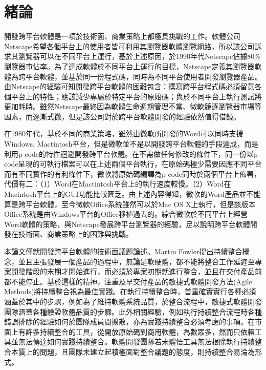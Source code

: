 \chapter{緒論}

開發跨平台軟體是一項於技術面、商業策略上都極具挑戰的工作。軟體公司Netscape希望各個平台上的使用者皆可利用其瀏覽器軟體瀏覽網路，所以該公司訴求其瀏覽器可以在不同平台上運行，基於上述原因，於1990年代Netscape佔據80\%瀏覽器市佔率\cite{netscape1990marketshare}。為了達成軟體於不同平台上運行的目標，Netscape定義其瀏覽器軟體為跨平台軟體，並基於同一份程式碼，同時為不同平台使用者開發瀏覽器產品。由Netscape的經驗可知開發跨平台軟體的困難包含：撰寫跨平台程式碼必須留意各個平台上的特性；應該減少專屬於特定平台的原始碼；與於不同平台上執行測試將更加耗時\cite{netscapecrossplatform}。雖然Netscape最終因為軟體生命週期管理不當、微軟競逐瀏覽器市場等因素，而逐漸式微，但是該公司對於跨平台軟體開發的經驗依然值得借鏡。

在1980年代，基於不同的商業策略，雖然由微軟所開發的Word可以同時支援Windows, Mactintosh平台，但是微軟並不是以開發跨平台軟體的手段達成，而是利用p-code\cite{microsoftpcode}的特性迴避開發跨平台軟體\cite{netscapecrossplatform}。在不需做任何修改的條件下，同一份以p-code呈現的可執行檔案可以在上述兩個平台執行，在原始碼極少需要因應不同平台而有不同實作的有利條件下，微軟將原始碼編譯為p-code同時於兩個平台上佈署，代價有二：（1）Word在Mactintosh平台上的執行速度較慢。（2）Word在Macintosh平台上的GUI功能比較匱乏。由上述內容得知，微軟的Word產品並不能算是跨平台軟體，至今微軟Office系統雖然可以於Mac OS X上執行，但是該版本Office系統是由Windows平台的Office移植過去的。綜合微軟於不同平台上經營Word軟體的策略，與Netscape發展跨平台瀏覽器的經驗，足以說明跨平台軟體開發在技術面、商業策略上的困難與挑戰。

本論文僅就開發跨平台軟體的技術面議題論述。Martin Fowler提出持續整合概念，並且主張發展一個產品的過程中，無論是軟硬體，都不能將整合工作延遲至專案開發階段的末期才開始進行，而必須於專案初期就進行整合，並且在交付產品前都不能停止\cite{martinfowlerci}。基於這樣的精神，注重及早交付產品的敏捷式軟體開發方法(Agile Methods)將持續整合視為最佳實踐\cite{xpagilemethods}。在執行持續整合時，首重確實實行各種必須涵蓋於其中的步驟，例如為了維持軟體系統品質，於整合流程中，敏捷式軟體開發團隊涵蓋各種驗證軟體品質的步驟。此外相關經驗，例如執行持續整合流程時各種錯誤排除的經驗如何於團隊成員間擴散，亦為實踐持續整合必須考慮的事項。在市面上有許多持續整合的工具，從開放原始碼到商用軟體，為數眾多，然而只依賴工具並無法傳達如何實踐持續整合。軟體開發團隊若未體悟工具無法根除執行持續整合本質上的問題，且團隊未建立起積極面對整合議題的態度，則持續整合易淪為形式。

